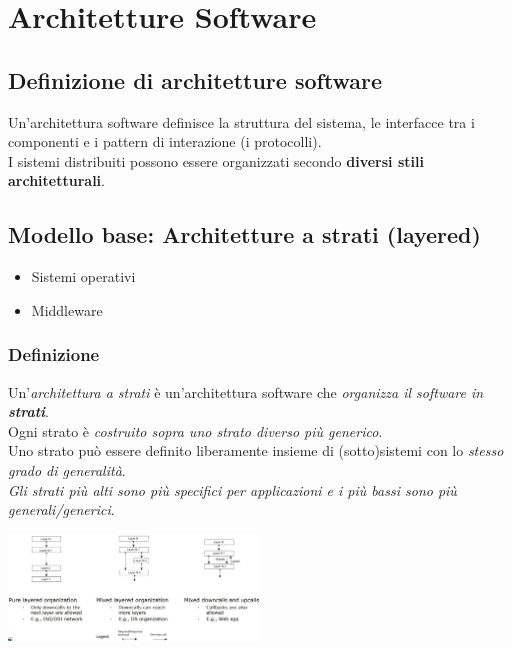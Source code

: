 
\chapter{Architetture Software}
\section{Definizione di architetture software}
Un'architettura software definisce la struttura del sistema, le interfacce tra i componenti e i pattern di interazione (i protocolli). 
\\I sistemi distribuiti possono essere organizzati secondo \textbf{diversi stili architetturali}.

\section{Modello base: Architetture a strati (layered)}
\begin{itemize}
    \item Sistemi operativi
    \item Middleware
\end{itemize}
\subsection{Definizione}
Un'\textit{architettura a strati} è un'architettura software che \textit{organizza il software in \textbf{strati}}.
\\Ogni strato è \textit{costruito sopra uno strato diverso più generico}.
\\Uno strato può essere definito liberamente insieme di (sotto)sistemi con lo \textit{stesso grado di generalità}.
\\\textit{Gli strati più alti sono più specifici per applicazioni e i più bassi sono più generali/generici}.
\begin{center}
    \includegraphics[width=0.5\textwidth]{img/architetturaStrati1.jpg}
\end{center}

